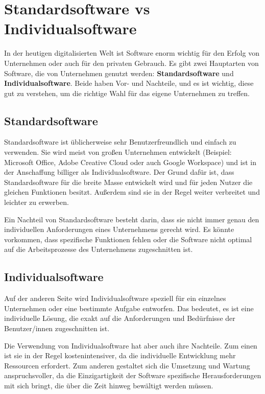 \section {Standardsoftware vs Individualsoftware}

In der heutigen digitalisierten Welt ist Software enorm wichtig für den Erfolg von Unternehmen 
oder auch für den privaten Gebrauch.
Es gibt zwei Hauptarten von Software, die von Unternehmen genutzt werden: \textbf{Standardsoftware} und 
\textbf{Individualsoftware}.
Beide haben Vor- und Nachteile, und es ist wichtig, 
diese gut zu verstehen, um die richtige Wahl für das eigene Unternehmen zu treffen.

\subsection*{Standardsoftware}

Standardsoftware ist üblicherweise sehr Benutzerfreundlich und einfach zu verwenden. 
Sie wird meist von großen Unternehmen entwickelt 
(Beispiel: Microsoft Office, Adobe Creative Cloud oder auch Google Workspace) 
und ist in der Anschaffung billiger als Individualsoftware. 
Der Grund dafür ist, dass Standardsoftware für die breite Masse entwickelt wird 
und für jeden Nutzer die gleichen Funktionen besitzt. 
Außerdem sind sie in der Regel weiter verbreitet und leichter zu erwerben.

Ein Nachteil von Standardsoftware besteht darin, dass sie nicht immer genau 
den individuellen Anforderungen eines Unternehmens gerecht wird. 
Es könnte vorkommen, dass spezifische Funktionen fehlen oder die Software 
nicht optimal auf die Arbeitsprozesse des Unternehmens zugeschnitten ist. 

\subsection*{Individualsoftware}

Auf der anderen Seite wird Individualsoftware speziell für ein einzelnes 
Unternehmen oder eine bestimmte Aufgabe entworfen. 
Das bedeutet, es ist eine individuelle Lösung, die exakt auf 
die Anforderungen und Bedürfnisse der Benutzer/innen zugeschnitten ist.

Die Verwendung von Individualsoftware hat aber auch ihre Nachteile. 
Zum einen ist sie in der Regel kostenintensiver, da die individuelle Entwicklung 
mehr Ressourcen erfordert. Zum anderen gestaltet sich die Umsetzung und Wartung 
anspruchsvoller, da die Einzigartigkeit der Software spezifische Herausforderungen 
mit sich bringt, die über die Zeit hinweg bewältigt werden müssen.

